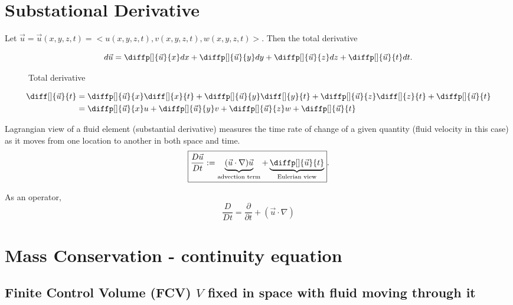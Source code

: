 \subsectionfont{\fontsize{10}{10}\selectfont}

\section{Substational Derivative}%

Let $\vec{u} = \vec{u}(x,y,z,t) = <u(x,y,z,t), v(x,y,z,t), w(x,y,z,t)>$. Then the total derivative

\[
  d\vec{u} = \diffp[]{\vec{u}}{x}dx + \diffp[]{\vec{u}}{y}dy
  + \diffp[]{\vec{u}}{z}dz + \diffp[]{\vec{u}}{t}dt
.\] 

\begin{figure}[ht]
    \centering
    \caption{Total derivative}
    \label{fig:total-derivative}
\end{figure}


\begin{align*}
  \diff[]{\vec{u}}{t} &= \diffp[]{\vec{u}}{x}\diff[]{x}{t}
  + \diffp[]{\vec{u}}{y}\diff[]{y}{t} + \diffp[]{\vec{u}}{z}\diff[]{z}{t}
  + \diffp[]{\vec{u}}{t} \\
                      &= \diffp[]{\vec{u}}{x}u + \diffp[]{\vec{u}}{y}v
  + \diffp[]{\vec{u}}{z}w + \diffp[]{\vec{u}}{t}
\end{align*}

Lagrangian view of a fluid element (substantial derivative) measures the time
rate of change of a given quantity (fluid velocity in this case) as it
moves from one location to another in both space and time.
\[
  \boxed{\frac{D \vec{u}}{Dt} :=
    \underbrace{(\vec{u}\cdot\nabla)\vec{u}}_\text{advection term}
  + \underbrace{\diffp[]{\vec{u}}{t}}_\text{Eulerian view}}
.\] 

As an operator,
\begin{equation} \label{eq:SD}
  \boxed{\frac{D}{Dt} = \frac{\partial}{\partial t} + (\vec{u}\cdot\nabla)}
\end{equation}


\section{Mass Conservation - continuity equation}%
\subsection{Finite Control Volume (FCV) $V$ fixed in space with fluid moving through
it}%

